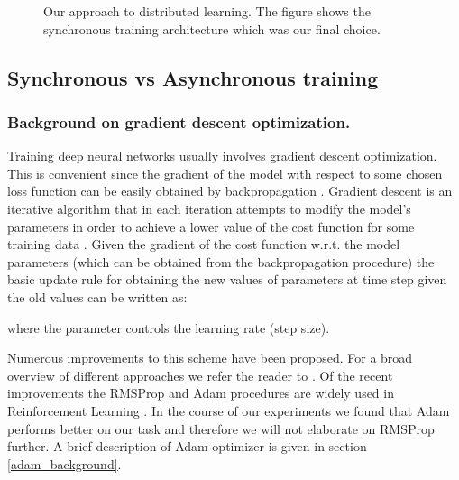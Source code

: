 \documentclass{llncs}
\begin{document}
\begin{figure}[h]
 \caption{Our approach to distributed learning. The figure shows the synchronous training architecture which was our final choice.}
\label{fig:architecture}
\end{figure}
\vspace{-1cm}

\subsection{Synchronous vs Asynchronous training} 
\label{section_sync_async}
\subsubsection{Background on gradient descent optimization.}
Training deep neural networks usually involves gradient descent optimization. This is convenient since the gradient of the model with respect to some chosen loss function can be easily obtained by backpropagation \cite{optimization_reference}. Gradient descent is an iterative algorithm that in each iteration attempts to modify the model's parameters  in order to achieve a lower value of the cost function  for some training data . Given the gradient  of the cost function w.r.t. the model parameters  (which can be obtained from the backpropagation procedure) the basic update rule for obtaining the new values of parameters at time step  given the old values  can be written as:

where the  parameter controls the learning rate (step size).

Numerous improvements to this scheme have been proposed. For a broad overview of different approaches we refer the reader to \cite{optimization_reference}. Of the recent improvements the RMSProp \cite{rmsprop_paper} and Adam \cite{adam_paper} procedures are widely used in Reinforcement Learning \cite{deepmind_nature,deepmind_a3c,ga3c_2017,ba3c_paper,ppo}. In the course of our experiments we found that Adam performs better on our task and therefore we will not elaborate on RMSProp further. A brief description of Adam optimizer is given in section \ref{adam_background}.	
\end{document}
